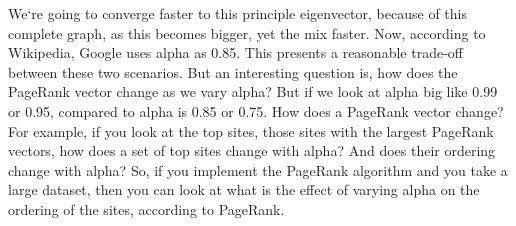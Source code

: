 We`re going to converge faster to this principle eigenvector, because of this complete graph, as this becomes bigger, yet the mix faster.
Now, according to Wikipedia, Google uses alpha as 0.85.
This presents a reasonable trade-off between these two scenarios.
But an interesting question is, how does the PageRank vector change as we vary alpha? But if we look at alpha big like 0.99 or 0.95, compared to alpha is 0.85 or 0.75.
How does a PageRank vector change? For example, if you look at the top sites, those sites with the largest PageRank vectors, how does a set of top sites change with alpha? And does their ordering change with alpha? So, if you implement the PageRank algorithm and you take a large dataset, then you can look at what is the effect of varying alpha on the ordering of the sites, according to PageRank.

